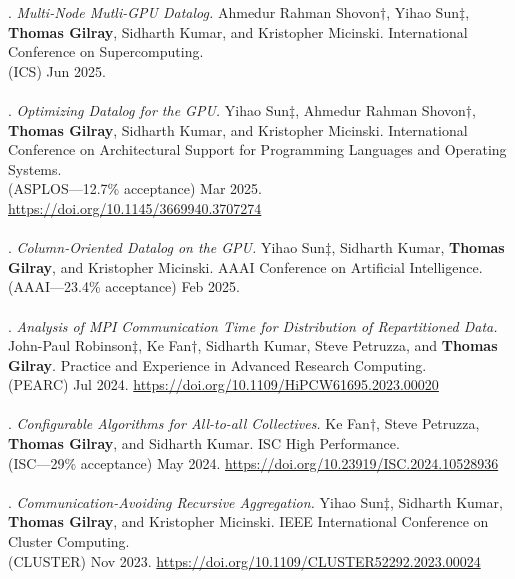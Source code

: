 \paper. \textit{Multi-Node Mutli-GPU Datalog.}
Ahmedur Rahman Shovon$\dagger$, Yihao Sun$\ddagger$, \textbf{Thomas Gilray}, Sidharth Kumar, and Kristopher Micinski.
International Conference on Supercomputing.
\\(ICS) Jun 2025.
\\ \vspace{-0.1cm}\\
\paper. \textit{Optimizing Datalog for the GPU.}
Yihao Sun$\ddagger$, Ahmedur Rahman Shovon$\dagger$, \textbf{Thomas Gilray}, Sidharth Kumar, and Kristopher Micinski.
International Conference on Architectural Support for Programming Languages and Operating Systems.
\\(ASPLOS---12.7\% acceptance) Mar 2025. \url{https://doi.org/10.1145/3669940.3707274}
\\ \vspace{-0.1cm}\\
\paper. \textit{Column-Oriented Datalog on the GPU.}
Yihao Sun$\ddagger$, Sidharth Kumar, \textbf{Thomas Gilray}, and Kristopher Micinski.
AAAI Conference on Artificial Intelligence.
\\(AAAI---23.4\% acceptance) Feb 2025.
\\ \vspace{-0.1cm}\\
\paper. \textit{Analysis of MPI Communication Time for Distribution of Repartitioned Data.}
John-Paul Robinson$\ddagger$, Ke Fan$\dagger$, Sidharth Kumar, Steve Petruzza, and \textbf{Thomas Gilray}.
Practice and Experience in Advanced Research Computing.
\\(PEARC) Jul 2024. \url{https://doi.org/10.1109/HiPCW61695.2023.00020}
\\ \vspace{-0.1cm}\\
\paper. \textit{Configurable Algorithms for All-to-all Collectives.}
Ke Fan$\dagger$, Steve Petruzza, \textbf{Thomas Gilray}, and Sidharth Kumar.
ISC High Performance.
\\(ISC---29\% acceptance) May 2024. \url{https://doi.org/10.23919/ISC.2024.10528936}
\\ \vspace{-0.1cm}\\
\paper. \textit{Communication-Avoiding Recursive Aggregation.}
Yihao Sun$\ddagger$, Sidharth Kumar, \textbf{Thomas Gilray}, and Kristopher Micinski.
IEEE International Conference on Cluster Computing.
\\(CLUSTER) Nov 2023. \url{https://doi.org/10.1109/CLUSTER52292.2023.00024}
